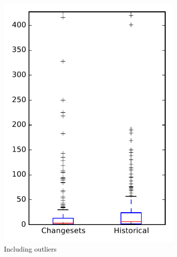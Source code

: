 
\begin{figure}
    \centering
    \begin{subfigure}{.4\textwidth}
        \centering
        \includegraphics[height=0.4\textheight]{figures/flt/rq2_zookeeper}
        \caption{Including outliers}\label{fig:flt:rq2:zookeeper_outlier}
    \end{subfigure}%
    \begin{subfigure}{.4\textwidth}
        \centering

\end{subfigure}
\end{figure}
